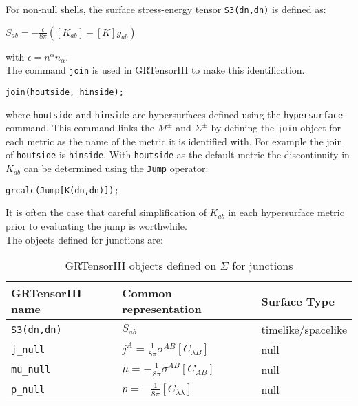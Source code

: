 \documentclass{article}
\begin{document}
For non-null shells, the surface stress-energy tensor \texttt{S3(dn,dn)} is defined as:
\begin{center}
$S_{ab} = - \frac{\epsilon}{8 \pi} \left( \left[K_{ab}\right] - \left[K\right]g_{ab} \right)$
\end{center}
with $\epsilon = n^\alpha n_\alpha$. \\

The command \texttt{join} is used in GRTensorIII to make this identification.
\begin{verbatim}
join(houtside, hinside);
\end{verbatim}
where \texttt{houtside} and \texttt{hinside} are hypersurfaces defined using the \texttt{hypersurface} command. This command
links the $M^\pm$ and $\Sigma^\pm$ by defining the \texttt{join} object for each metric as the name of the metric it is identified with. 
For example the join of \texttt{houtside} is \texttt{hinside}. With \texttt{houtside} as the default metric the discontinuity in $K_{ab}$ can be determined
using the \texttt{Jump} operator:
\begin{verbatim}
grcalc(Jump[K(dn,dn)]);
\end{verbatim}

It is often the case that careful simplification of $K_{ab}$ in each hypersurface metric prior to evaluating the jump is worthwhile. \\

The objects defined for junctions are:
\renewcommand{\arraystretch}{1.5}
\begin{table}[h]
  \begin{center}
    \begin{tabular}{lll}\hline\hline
      \textbf{GRTensorIII name} & \textbf{Common representation} & Surface Type \\ \hline
      \texttt{S3(dn,dn)}        & $S_{ab} $ & timelike/spacelike  \\
      \texttt{j\_null}   & $ j^A = \frac{1}{8 \pi} \sigma^{AB} \left[C_{\lambda B}\right]$ & null \\
      \texttt{mu\_null}   &$ \mu= - \frac{1}{8 \pi} \sigma^{AB} \left[C_{AB}\right]$ & null \\
      \texttt{p\_null}   &$ p = -\frac{1}{8 \pi} \left[C_{\lambda \lambda}\right]$ & null \\
    \end{tabular}
    \caption{GRTensorIII objects defined on $\Sigma$ for junctions}
    \label{tab:junc}
  \end{center}
\end{table}
\end{document}
